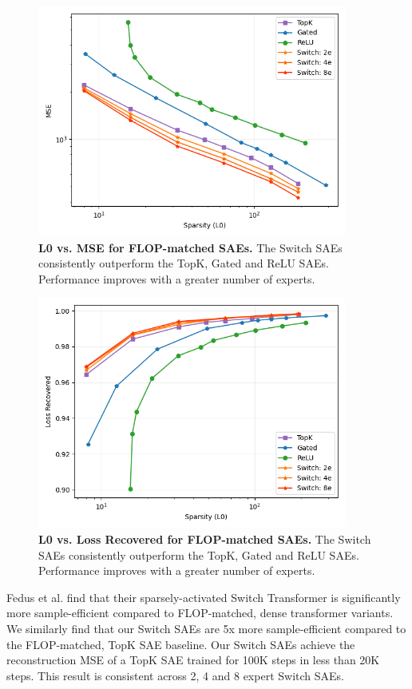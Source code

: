 \documentclass{article} %
\begin{document}
\begin{figure}[h]
\begin{center}
\includegraphics[width=4in]{fig/flopmatch_l0_mse.png}
\end{center}
\caption{\textbf{L0 vs. MSE for FLOP-matched SAEs.} The Switch SAEs consistently outperform the TopK, Gated and ReLU SAEs. Performance improves with a greater number of experts.}
\end{figure}

\begin{figure}[h]
\begin{center}
\includegraphics[width=4in]{fig/flopmatch_l0_lossrec.png}
\end{center}
\caption{\textbf{L0 vs. Loss Recovered for FLOP-matched SAEs.} The Switch SAEs consistently outperform the TopK, Gated and ReLU SAEs. Performance improves with a greater number of experts.}
\end{figure}

Fedus et al. find that their sparsely-activated Switch Transformer is significantly more sample-efficient compared to FLOP-matched, dense transformer variants. We similarly find that our Switch SAEs are 5x more sample-efficient compared to the FLOP-matched, TopK SAE baseline. Our Switch SAEs achieve the reconstruction MSE of a TopK SAE trained for 100K steps in less than 20K steps. This result is consistent across 2, 4 and 8 expert Switch SAEs.
\end{document}
